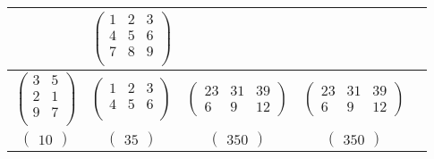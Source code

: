 \begin{table}[ht]
\begin{center}
\begin{threeparttable}
\begin{tabular}{|c|c|c|c|c|}
				&
				$\begin{pmatrix}
					1 & 2 & 3\\
					4 & 5 & 6 \\
					7 & 8 & 9 \\
				\end{pmatrix}$ \\ 
				\hline
				$\begin{pmatrix}
					3 & 5\\
					2 & 1\\
					9 & 7\\
				\end{pmatrix}$
				&
				$\begin{pmatrix}
					1 & 2 & 3\\
					4 & 5 & 6 \\
				\end{pmatrix}$
				&
				$\begin{pmatrix}
					23 & 31 & 39 \\
					6 & 9 & 12
				\end{pmatrix}$ 
				&
				$\begin{pmatrix}
					23 & 31 & 39 \\
					6 & 9 & 12
				\end{pmatrix}$ \\ 
				\hline
				$\begin{pmatrix}
					10
				\end{pmatrix}$
				&
				$\begin{pmatrix}
					35
				\end{pmatrix}$
				&
				$\begin{pmatrix}
					350
				\end{pmatrix}$ 
				&
				$\begin{pmatrix}
					350
				\end{pmatrix}$ \\ 
				\hline
			\end{tabular}
		\end{threeparttable}
	\end{center}
\end{table}

